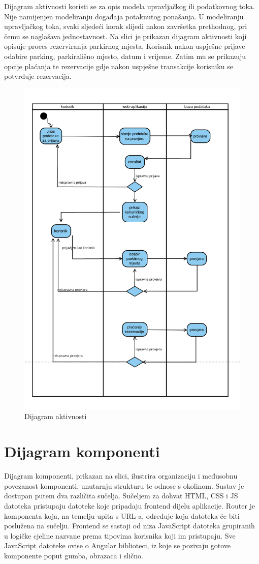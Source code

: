 			
			
			 {Dijagram aktivnosti koristi se za opis modela upravljačkog ili podatkovnog toka. Nije namijenjen modeliranju događaja potaknutog ponašanja. U modeliranju upravljačkog toka, svaki sljedeći korak slijedi nakon završetka prethodnog, pri čemu se naglašava jednostavnost. Na slici je prikazan dijagram aktivnosti koji opisuje proces rezerviranja parkirnog mjesta. Korisnik nakon uspješne prijave odabire parking, parkirališno mjesto, datum i vrijeme. Zatim mu se prikazuju opcije plaćanja te rezervacije gdje nakon uspješne transakcije korisniku se potvrđuje rezervacija.}
			
			\begin{figure}[hbt!]
				\centering
				\includegraphics[width=0.7\linewidth]{slike/DijagrammmAktivnosti.png}
				\caption{Dijagram aktivnosti}
				\label{fig:DijagrammmAktivnosti}
			\end{figure}
			
			
			\eject
		\section{Dijagram komponenti}
		
			
		
			 {Dijagram komponenti, prikazan na slici, ilustrira organizaciju i međusobnu povezanost komponenti, unutarnju strukturu te odnose s okolinom. Sustav je dostupan putem dva različita sučelja. Sučeljem za dohvat HTML, CSS i JS datoteka pristupaju datoteke koje pripadaju frontend dijelu aplikacije. Router je komponenta koja, na temelju upita s URL-a, određuje koja datoteka će biti poslužena na sučelju. Frontend se sastoji od niza JavaScript datoteka grupiranih u logičke cjeline nazvane prema tipovima korisnika koji im pristupaju. Sve JavaScript datoteke ovise o Angular biblioteci, iz koje se pozivaju gotove komponente poput gumba, obrazaca i slično.}
			 
